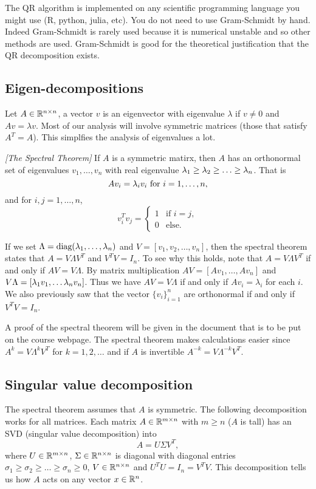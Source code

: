 The QR algorithm is implemented on any scientific programming language you might use (R, python, julia, etc). You do not need to use Gram-Schmidt by hand. Indeed Gram-Schmidt is rarely used because it is numerical unstable and so other methods are used. Gram-Schmidt is good for the theoretical justification that the QR decomposition exists. 


\subsection{Eigen-decompositions}
Let $A \in {\mathbb R}^{n \times n}$, a vector $v$ is an eigenvector with eigenvalue $\lambda$ if $v \neq 0$ and $Av = \lambda v$. Most of our analysis will involve symmetric matrices (those that satisfy $A^T = A$). This simplfies the analysis of eigenvalues a lot.
\begin{thrm}
    \emph{[The Spectral Theorem]} If $A$ is a symmetric matirx, then $A$ has an orthonormal set of eigenvalues $v_1,\ldots,v_n$ with real eigenvalue $\lambda_1 \ge \lambda_2 \ge \ldots \ge \lambda_n$. That is 
    \[Av_i = \lambda_i v_i \text{ for } i = 1,\ldots,n, \]
    and for $i,j =1,\ldots,n$,
    \[v_i^Tv_j = \begin{cases}
        1 & \text{if } i =j,\\
        0 & \text{else}.
    \end{cases} \]
\end{thrm}
If we set $\Lambda = \text{diag}(\lambda_1,\ldots,\lambda_n)$ and $V = [v_1,v_2,\ldots,v_n]$, then the spectral theorem states that $A = V\Lambda V^T$ and $V^TV = I_n$. To see why this holds, note that $A = V \Lambda V^T$ if and only if $AV = V\Lambda$. By matrix multiplication $AV = [Av_1,\ldots, Av_n]$ and $V\Lambda = [\lambda_1v_1,\ldots \lambda_n v_n]$. Thus we have $AV =V\Lambda$ if and only if $Av_i = \lambda_i$ for each $i$. We also previously saw that the vector $\{v_i\}_{i=1}^n$ are orthonormal if and only if $V^TV = I_n$. 

A proof of the spectral theorem will be given in the document that is to be put on the course webpage. The spectral theorem makes calculations easier since $A^k = V\Lambda^k V^T$ for $k = 1,2,\ldots$ and if $A$ is invertible $A^{-k} = V\Lambda^{-k}V^T$. 
\subsection{Singular value decomposition}
The spectral theorem assumes that $A$ is symmetric. The following decomposition works for all matrices. Each matrix $A \in {\mathbb R}^{m \times n}$ with $m \ge n$ ($A$ is tall) has an SVD (singular value decomposition) into
\[A=U\Sigma V^T, \]
where $U \in {\mathbb R}^{m \times n}$, $\Sigma \in {\mathbb R}^{n \times n}$ is diagonal with diagonal entries $\sigma_1 \ge \sigma_2 \ge \ldots \ge \sigma_n \ge 0$, $V \in {\mathbb R}^{n \times n}$ and $U^TU = I_n = V^TV$. This decomposition tells us how $A$ acts on any vector $x \in {\mathbb R}^n$. 

